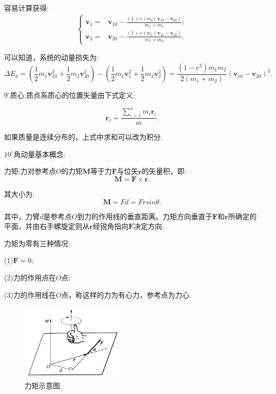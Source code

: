 \documentclass[UTF8]{ctexart}
\begin{document}
	容易计算获得:
	\begin{equation*}
		\begin{aligned}
			\left\{
			\begin{split}
				{\boldsymbol v}_{1}=&{\boldsymbol v}_{10}-\frac{(1+e)m_2({\boldsymbol v}_{10}-{\boldsymbol v}_{20})}{m_1+m_2};\\
				{\boldsymbol v}_{2}=&{\boldsymbol v}_{20}-\frac{(1+e)m_1({\boldsymbol v}_{10}-{\boldsymbol v}_{20})}{m_1+m_2}.
			\end{split}
			\right.
		\end{aligned}
	\end{equation*}

	可以知道，系统的动量损失为:
	\begin{equation*}
		\Delta E_k=(\frac{1}{2}m_1{\boldsymbol v}^2_{10}+\frac{1}{2}m_2{\boldsymbol v}^2_{20})-(\frac{1}{2}m_1{\boldsymbol v}^2_{1}+\frac{1}{2}m_2{\boldsymbol v}^2_{2})=\frac{(1-e^2)m_1m_2}{2(m_1+m_2)}({\boldsymbol v}_{10}-{\boldsymbol v}_{20})^2.
	\end{equation*}

	$9^{\circ}$质心:质点系质心的位置矢量由下式定义:
	
	\begin{equation*}
		{\boldsymbol r}_c=\frac{\sum_{i=1}^{n}m_i{\boldsymbol r}_i}{m}.
	\end{equation*}

	如果质量是连续分布的，上式中求和可以改为积分.

	$10^{\circ}$角动量基本概念:

	力矩:力对参考点$O$的力矩${\boldsymbol M}$等于力${\boldsymbol F}$与位矢${\boldsymbol r}$的矢量积，即:
	\begin{equation*}
		{\boldsymbol M}={\boldsymbol F}\times{\boldsymbol r}.
	\end{equation*}

	其大小为:
	\begin{equation*}
		{\boldsymbol M}=Fd=Frsin\theta.
	\end{equation*}

	其中，力臂$d$是参考点$O$到力的作用线的垂直距离。力矩方向垂直于${\boldsymbol F}$和${\boldsymbol r}$所确定的平面，并由右手螺旋定则从${\boldsymbol r}$经锐角指向${\boldsymbol F}$决定方向.

	力矩为零有三种情况:

	(1)${\boldsymbol F}=0$;

	(2)力的作用点在$O$点;

	(3)力的作用线在$O$点，称这样的力为有心力，参考点为力心.
	\begin{figure}[h]
		\begin{center}
		\includegraphics[width=0.45\textwidth]{liju-1}
		\caption{力矩示意图.}
		\end{center}
	\end{figure}
\end{document}
